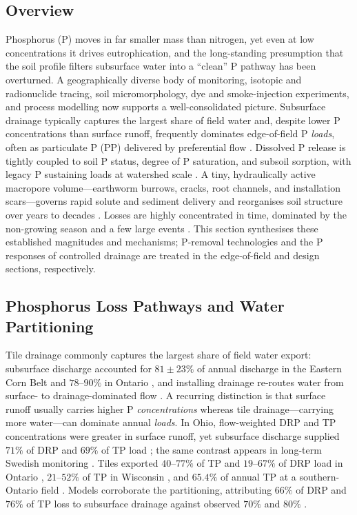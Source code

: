 \subsection{Overview}

Phosphorus (P) moves in far smaller mass than nitrogen, yet even at low
concentrations it drives eutrophication, and the long-standing presumption
that the soil profile filters subsurface water into a ``clean'' P pathway
has been overturned. A geographically diverse body of monitoring, isotopic
and radionuclide tracing, soil micromorphology, dye and smoke-injection
experiments, and process modelling now supports a well-consolidated
picture. Subsurface drainage typically captures the largest share of field
water and, despite lower P concentrations than surface runoff, frequently
dominates edge-of-field P \emph{loads}, often as particulate P (PP)
delivered by preferential flow
\parencite{Pease2018,VanEsbroeck2016,Uusitalo2001,Laubel1999}. Dissolved P
release is tightly coupled to soil P status, degree of P saturation, and
subsoil sorption, with legacy P sustaining loads at watershed scale
\parencite{Sharpley1995,Beauchemin2003,Jarvie2017}. A tiny, hydraulically
active macropore volume---earthworm burrows, cracks, root channels, and
installation scars---governs rapid solute and sediment delivery and
reorganises soil structure over years to decades
\parencite{Shipitalo2004,Villholth1998,Montagne2008}. Losses are highly
concentrated in time, dominated by the non-growing season and a few large
events \parencite{VanEsbroeck2016,Brendel2019}. This section synthesises
these established magnitudes and mechanisms; P-removal technologies and the
P responses of controlled drainage are treated in the edge-of-field and
design sections, respectively.

\subsection{Phosphorus Loss Pathways and Water Partitioning}

Tile drainage commonly captures the largest share of field water export:
subsurface discharge accounted for $81\pm23\%$ of annual discharge in the
Eastern Corn Belt \parencite{Pease2018} and $78$--$90\%$ in Ontario
\parencite{VanEsbroeck2016}, and installing drainage re-routes water from
surface- to drainage-dominated flow \parencite{Turtola1995,BENGTSON1995}. A
recurring distinction is that surface runoff usually carries higher P
\emph{concentrations} whereas tile drainage---carrying more water---can
dominate annual \emph{loads}. In Ohio, flow-weighted DRP and TP
concentrations were greater in surface runoff, yet subsurface discharge
supplied $71\%$ of DRP and $69\%$ of TP load \parencite{Pease2018}; the same
contrast appears in long-term Swedish monitoring \parencite{Norberg2022}.
Tiles exported $40$--$77\%$ of TP and $19$--$67\%$ of DRP load in Ontario
\parencite{VanEsbroeck2016}, $21$--$52\%$ of TP in Wisconsin
\parencite{Madison2014}, and $65.4\%$ of annual TP at a southern-Ontario
field \parencite{Qi2018}. Models corroborate the partitioning, attributing
$66\%$ of DRP and $76\%$ of TP loss to subsurface drainage against observed
$70\%$ and $80\%$ \parencite{Grewal2025,Sadhukhan2019b}.

